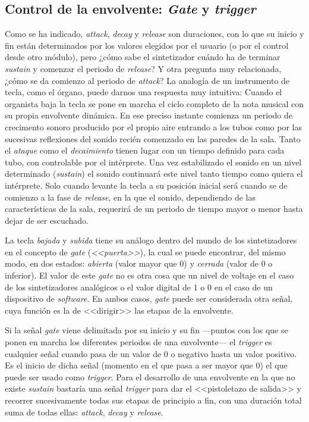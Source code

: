 \subsection{Control de la envolvente: \textit{Gate} y \textit{trigger}}

Como se ha indicado, \textit{attack}, \textit{decay} y \textit{release} son duraciones, con lo que su inicio y fin están determinados por los valores elegidos por el usuario (o por el control desde otro módulo), pero ¿cómo sabe el sintetizador cuándo ha de terminar \textit{sustain} y comenzar el periodo de \textit{release}? Y otra pregunta muy relacionada, ¿cómo se da comienzo al periodo de \textit{attack}? La analogía de un instrumento de tecla, como el órgano, puede darnos una respuesta muy intuitiva: Cuando el organista baja la tecla se pone en marcha el ciclo completo de la nota musical con su propia envolvente dinámica. En ese preciso instante comienza un periodo de crecimento sonoro producido por el propio aire entrando a los tubos como por las sucesivas reflexiones del sonido recién comenzado en las paredes de la sala. Tanto el \textit{ataque} como el \textit{decaimiento} tienen lugar con un tiempo definido para cada tubo, con controlable por el intérprete. Una vez estabilizado el sonido en un nivel determinado (\textit{sustain}) el sonido continuará este nivel tanto tiempo como quiera el intérprete. Solo cuando levante la tecla a su posición inicial será cuando se de comienzo a la fase de \textit{release}, en la que el sonido, dependiendo de las características de la sala, requerirá de un periodo de tiempo mayor o menor hasta dejar de ser escuchado.

La tecla \textit{bajada} y \textit{subida} tiene su análogo dentro del mundo de los sintetizadores en el concepto de \textit{gate} (\textit{<<puerta>>}), la cual se puede encontrar, del mismo modo, en dos estados: \textit{abierta} (valor mayor que 0) y \textit{cerrada} (valor de 0 o inferior). El valor de este \textit{gate} no es otra cosa que un nivel de voltaje en el caso de los sintetizadores analógicos o el valor digital de 1 o 0 en el caso de un dispositivo de \textit{software}. En ambos casos, \textit{gate} puede ser considerada otra señal, cuya función es la de <<dirigir>> las etapas de la envolvente. 

Si la señal \textit{gate} viene delimitada por su inicio y su fin ---puntos con los que se ponen en marcha los diferentes periodos de una envolvente--- el \textit{trigger} es cualquier señal cuando pasa de un valor de 0 o negativo hasta un valor positivo. Es el inicio de dicha señal (momento en el que pasa a ser mayor que 0) el que puede ser usado como \textit{trigger}. Para el desarrollo de una envolvente en la que no existe \textit{sustain} bastaría una señal \textit{trigger} para dar el <<pistoletazo de salida>> y recorrer sucesivamente todas sus etapas de principio a fin, con una duración total suma de todas ellas: \textit{attack}, \textit{decay} y \textit{release}. 


